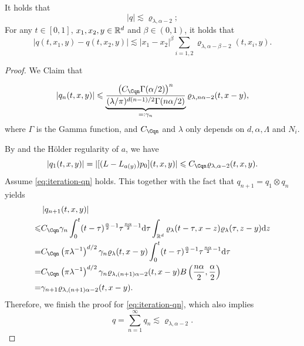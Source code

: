 \begin{lemma}\label{Lem:q}
    It holds that  
    \begin{equation}\label{eq:q-uper}
        |q|\lesssim \varrho_{\lambda, \alpha-2};
    \end{equation}
    For any \(t\in [0,1]\), \(x_1,x_2,y\in {\mathbb R}^d\) and \(\beta\in (0,1) \), it holds that 
    \begin{equation}\label{eq:q-holder}
        |q(t,x_1,y)-q(t,x_2,y)|\lesssim |x_1-x_2|^{\beta} \sum_{i=1,2}\varrho_{\lambda, \alpha-\beta-2}(t,x_i,y). 
    \end{equation}
\end{lemma}
\const{\Cqn}
\begin{proof}
    We Claim that 
    \begin{framed}
    \begin{equation}\label{eq:iteration-qn}
        |q_n(t,x,y)|\leq \underbrace{\frac{\left(C_{\Cqn} \Gamma(\alpha / 2)\right)^n}{(\lambda / \pi)^{d(n-1) / 2} \Gamma(n \alpha / 2)}}_{=:\gamma_n}\varrho_{\lambda, n\alpha-2}(t,x-y),
    \end{equation}
    where \(\Gamma\) is the Gamma function, and \(C_{\Cqn}\) and \(\lambda\) only depends on \(d,\alpha,\Lambda\) and \(N_i\). 
    \end{framed}
    By  and the H\"older regularity of \(a\), we have 
    \[
    |q_1(t,x,y)|=|[(L-L_{a(y)})p_0](t,x,y)|\leq C_{\Cqn} \varrho_{\lambda, \alpha-2} (t,x,y). 
    \]
    Assume \eqref{eq:iteration-qn} holds. This together with the fact that \(q_{n+1}=q_1\otimes q_n\) yields 
    \begin{equation*}
        \begin{aligned}
            & \left|q_{n+1}(t,x,y)\right| \\
            \leq& C_{\Cqn} \gamma_n \int_0^t (t-\tau)^{\frac{\alpha}{2}-1}\tau^{\frac{n \alpha}{2}-1} \d \tau \int_{\mathbb{R}^d} \varrho_{\lambda}(t-\tau, x-z) \varrho_{\lambda}(\tau, z-y) \mathrm{d} z   \\
            =& C_{\Cqn}\left(\pi \lambda^{-1}\right)^{d / 2} \gamma_n \varrho_{\lambda}(t, x-y)  \int_0^t (t-\tau)^{\frac{\alpha}{2}-1}\tau^{\frac{n \alpha}{2}-1} \d \tau \\
            =& C_{\Cqn} \left(\pi \lambda^{-1}\right)^{d / 2} \gamma_n \varrho_{\lambda,(n+1) \alpha-2}(t, x-y) B\left(\frac{n \alpha}{2}, \frac{\alpha}{2}\right)\\
            =&\gamma_{n+1} \varrho_{\lambda,(n+1) \alpha-2}(t, x-y). 
        \end{aligned}
    \end{equation*}
    Therefore, we finish the proof for \eqref{eq:iteration-qn}, which also implies 
    \begin{equation*}
        q=\sum_{n=1}^\infty q_n \lesssim \varrho_{\lambda, \alpha-2}.
    \end{equation*}


\end{proof}
